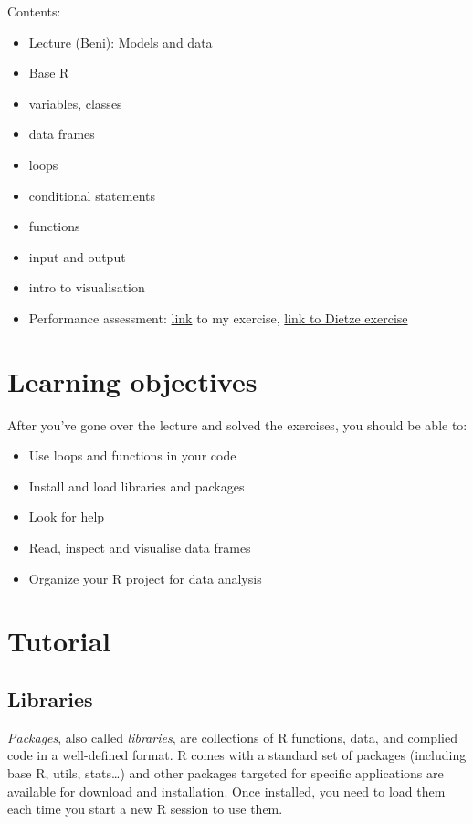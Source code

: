 \documentclass[
]{book}
\providecommand{\tightlist}{%
  \setlength{\itemsep}{0pt}\setlength{\parskip}{0pt}}
\begin{document}
Contents:

\begin{itemize}
\tightlist
\item
  Lecture (Beni): Models and data
\item
  Base R
\item
  variables, classes
\item
  data frames
\item
  loops
\item
  conditional statements
\item
  functions
\item
  input and output
\item
  intro to visualisation
\item
  Performance assessment: \href{https://stineb.netlify.app/files/ex1.pdf}{link} to my exercise, \href{https://github.com/stineb/EF_Activities/blob/master/Exercise_01_RPrimer.Rmd}{link to Dietze exercise}
\end{itemize}

\hypertarget{learning-objectives-1}{%
\section{Learning objectives}\label{learning-objectives-1}}

After you've gone over the lecture and solved the exercises, you should be able to:

\begin{itemize}
\tightlist
\item
  Use loops and functions in your code
\item
  Install and load libraries and packages
\item
  Look for help
\item
  Read, inspect and visualise data frames
\item
  Organize your R project for data analysis
\end{itemize}

\hypertarget{tutorial-1}{%
\section{Tutorial}\label{tutorial-1}}

\hypertarget{libraries}{%
\subsection{Libraries}\label{libraries}}

\emph{Packages}, also called \emph{libraries}, are collections of R functions, data, and complied code in a well-defined format. R comes with a standard set of packages (including base R, utils, stats\ldots) and other packages targeted for specific applications are available for download and installation. Once installed, you need to load them each time you start a new R session to use them.
\end{document}
